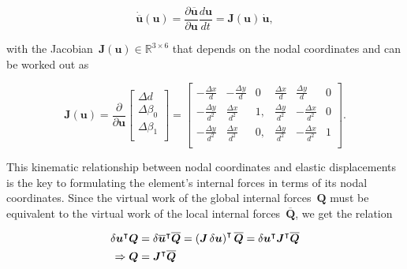 \begin{equation}
\dot{\overline{\boldsymbol{u}}}(\boldsymbol{u}) = \frac{\partial \overline{\boldsymbol{u}}}{\partial \boldsymbol{u}}\frac{d\boldsymbol{u}}{dt} = \boldsymbol{J}(\boldsymbol{u})\,\dot{\boldsymbol{u}},
\end{equation}

with the Jacobian~$\boldsymbol{J}(\boldsymbol{u}) \in \mathbb{R}^{3 \times 6}$ that depends on the nodal coordinates and can be worked out as

\begin{equation}
\renewcommand\arraystretch{1.5}
\boldsymbol{J}(\boldsymbol{u}) =
\frac{\partial}{\partial\boldsymbol{u}}
\begin{bmatrix}
\Delta d \\
\Delta \beta_0 \\
\Delta \beta_1 \\
\end{bmatrix}
=
\begin{bmatrix}
-\frac{\Delta x}{d} & -\frac{\Delta y}{d} & 0 & \frac{\Delta x}{d} & \frac{\Delta y}{d} & 0 \\
-\frac{\Delta y}{d^2} & \frac{\Delta x}{d^2} & 1, & \frac{\Delta y}{d^2} & -\frac{\Delta x}{d^2} & 0 \\
-\frac{\Delta y}{d^2} & \frac{\Delta x}{d^2} & 0, & \frac{\Delta y}{d^2} & -\frac{\Delta x}{d^2} & 1 \\
\end{bmatrix}.
\end{equation}

This kinematic relationship between nodal coordinates and elastic displacements is the key to formulating the element's internal forces in terms of its nodal coordinates.
Since the virtual work of the global internal forces~$\boldsymbol{Q}$ must be equivalent to the virtual work of the local internal forces~$\overline{\boldsymbol{Q}}$, we get the relation

\begin{align}
\delta\boldsymbol{u}^\intercal\boldsymbol{Q} &= \delta\overline{\boldsymbol{u}}^\intercal\overline{\boldsymbol{Q}} = \left(\boldsymbol{J}\,\delta\boldsymbol{u}\right)^\intercal\overline{\boldsymbol{Q}} = \delta\boldsymbol{u}^\intercal\boldsymbol{J}^\intercal\overline{\boldsymbol{Q}} \notag \\
\Rightarrow \boldsymbol{Q} &= \boldsymbol{J}^\intercal\overline{\boldsymbol{Q}} \label{eq:corotational-force-transform}
\end{align}

